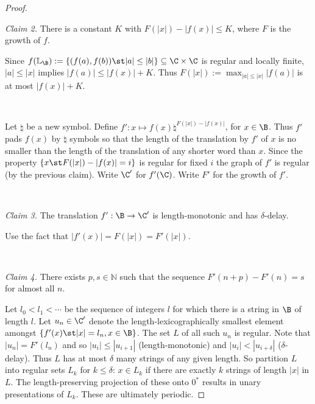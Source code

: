 \begin{proof}
\

\noindent
{\em Claim 2.} There is a constant $K$ with $F(|x|) - |f(x)| \leq K$, where $F$ is the growth of $f$.

Since $f(\mathbb{L}_\B) := \{(f(a),f(b)) \st |a| \leq |b|\} \subseteq \C \times \C$ is regular and locally finite, $|a| \leq |x|$ implies $|f(a)| \leq |f(x)| + K$. Thus
$F(|x|) := \max_{|a| \leq |x|} |f(a)|$ is at most $|f(x)| + K$.

\

Let $\natural$ be a new symbol. Define $f':x \mapsto f(x) \natural^{F(|x|) - |f(x)|}$, for $x \in \B$. Thus $f'$ pads 
$f(x)$ by $\natural$ symbols so that the length of the translation by $f'$ of $x$ is no smaller than the length of the translation of any shorter word than $x$. 
Since the property $\{x \st F(|x|)-|f(x)| = i\}$ is regular for fixed $i$
 the graph of $f'$ is regular (by the previous claim). Write $\C'$ for $f'(\C)$. Write $F'$ for the growth of $f'$.

\

\noindent
{\em Claim 3.} The translation $f':\B \to \C'$ is length-monotonic and has $\delta$-delay.

Use the fact that $|f'(x)| = F(|x|) = F'(|x|)$.

\

\noindent
{\em Claim 4.} There exists $p,s \in \mathbb{N}$ such that the sequence  $F'(n+p) - F'(n) = s$ for almost all $n$.

Let $l_0 < l_1 < \cdots$ be the sequence of integers $l$ for which there is a string in $\B$ of length $l$. Let 
$u_n \in \C'$ denote the length-lexicographically smallest element amongst $\{f'(x) \st |x| = l_n, x \in \B\}$.
The set $L$ of all such $u_n$ is regular. Note that $|u_n| = F'(l_n)$ and so $|u_i| \leq |u_{i+1}|$ (length-monotonic) and $|u_i| < |u_{i+\delta}|$ ($\delta$-delay).
Thus $L$ has at most $\delta$ many strings of any given length.
So partition $L$ into regular sets $L_k$ for $k \leq \delta$:  $x \in L_k$ if there are exactly $k$ strings of length $|x|$ in $L$. The length-preserving projection of these onto $0^\ast$ results in 
unary presentations of $L_k$. These are ultimately periodic.
%
%


\end{proof}

